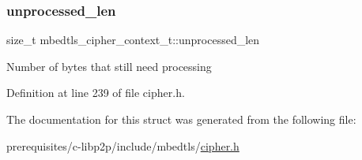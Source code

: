 \mbox{\label{structmbedtls__cipher__context__t_ad9bb94ad0e914bdceb20190cfebfc702}} 
\subsubsection{\texorpdfstring{unprocessed\+\_\+len}{unprocessed\_len}}
{\footnotesize\ttfamily size\+\_\+t mbedtls\+\_\+cipher\+\_\+context\+\_\+t\+::unprocessed\+\_\+len}

Number of bytes that still need processing 

Definition at line 239 of file cipher.\+h.



The documentation for this struct was generated from the following file\+:\begin{DoxyCompactItemize}
\item 
prerequisites/c-\/libp2p/include/mbedtls/\mbox{\hyperlink{cipher_8h}{cipher.\+h}}\end{DoxyCompactItemize}

